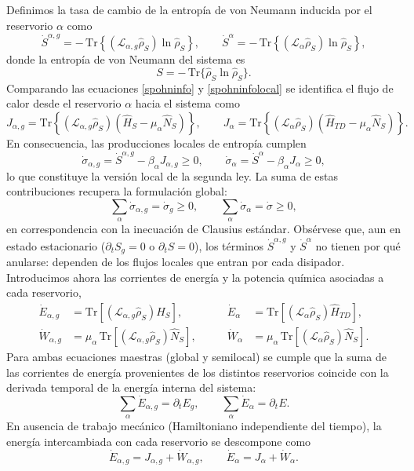 Definimos la tasa de cambio de la entropía de von Neumann inducida por el reservorio $\alpha$ como
\[
\dot{S}^{\alpha,g}
= -\,\mathrm{Tr}\!\left\{(\mathcal{L}_{\alpha,g}\hat{\rho}_{S})\ln\hat{\rho}_{S}\right\},
\qquad
\dot{S}^{\alpha}
= -\,\mathrm{Tr}\!\left\{(\mathcal{L}_{\alpha}\hat{\rho}_{S})\ln\hat{\rho}_{S}\right\},
\]
donde la entropía de von Neumann del sistema es
\[
S=-\,\mathrm{Tr}\{\hat{\rho}_{S}\ln\hat{\rho}_{S}\}.
\]
Comparando las ecuaciones \eqref{spohninfo} y \eqref{spohninfolocal} se identifica el flujo de calor desde el reservorio $\alpha$ hacia el sistema como
\[
J_{\alpha,g}
=\mathrm{Tr}\!\left\{(\mathcal{L}_{\alpha,g}\hat{\rho}_{S})
(\hat{H}_{S}-\mu_{\alpha}\hat{N}_{S})\right\},
\qquad
J_{\alpha}
=\mathrm{Tr}\!\left\{(\mathcal{L}_{\alpha}\hat{\rho}_{S})
(\hat{H}_{TD}-\mu_{\alpha}\hat{N}_{S})\right\}.
\]
En consecuencia, las producciones locales de entropía cumplen
\begin{equation}
    \dot{\sigma}_{\alpha,g}=\dot{S}^{\alpha,g}-\beta_{\alpha}J_{\alpha,g}\ge 0,
    \qquad
    \dot{\sigma}_{\alpha}=\dot{S}^{\alpha}-\beta_{\alpha}J_{\alpha}\ge 0,
    \label{sec4:localentropy}
\end{equation}
lo que constituye la versión local de la segunda ley. La suma de estas contribuciones recupera la formulación global:
\[
\sum_{\alpha}\dot{\sigma}_{\alpha,g}
=\dot{\sigma}_{g}\ge 0,
\qquad
\sum_{\alpha}\dot{\sigma}_{\alpha}
=\dot{\sigma}\ge 0,
\]
en correspondencia con la inecuación de Clausius estándar. Obsérvese que, aun en estado estacionario
($\partial_{t}S_{g}=0$ o $\partial_{t}S=0$), los términos
$\dot{S}^{\alpha,g}$ y $\dot{S}^{\alpha}$ no tienen por qué anularse: dependen de los flujos locales que entran por cada disipador.
\\

Introducimos ahora las corrientes de energía y la potencia química asociadas a cada reservorio,
\begin{align*}
    \dot{E}_{\alpha,g}
    &= \mathrm{Tr}\!\left[(\mathcal{L}_{\alpha,g}\hat{\rho}_{S})\hat{H}_{S}\right],
    &\qquad
    \dot{E}_{\alpha}
    &= \mathrm{Tr}\!\left[(\mathcal{L}_{\alpha}\hat{\rho}_{S})\hat{H}_{TD}\right],\\[2pt]
    \dot{W}_{\alpha,g}
    &= \mu_{\alpha}\,\mathrm{Tr}\!\left[(\mathcal{L}_{\alpha,g}\hat{\rho}_{S})\hat{N}_{S}\right],
    &\qquad
    \dot{W}_{\alpha}
    &= \mu_{\alpha}\,\mathrm{Tr}\!\left[(\mathcal{L}_{\alpha}\hat{\rho}_{S})\hat{N}_{S}\right].
\end{align*}
Para ambas ecuaciones maestras (global y semilocal) se cumple que la suma de las corrientes de energía provenientes de los distintos reservorios coincide con la derivada temporal de la energía interna del sistema:
\[
\sum_{\alpha}\dot{E}_{\alpha,g}=\partial_{t}E_{g},
\qquad
\sum_{\alpha}\dot{E}_{\alpha}=\partial_{t}E.
\]
En ausencia de trabajo mecánico (Hamiltoniano independiente del tiempo), la energía intercambiada con cada reservorio se descompone como
\[
\dot{E}_{\alpha,g}=J_{\alpha,g}+\dot{W}_{\alpha,g},
\qquad
\dot{E}_{\alpha}=J_{\alpha}+\dot{W}_{\alpha}.
\]

